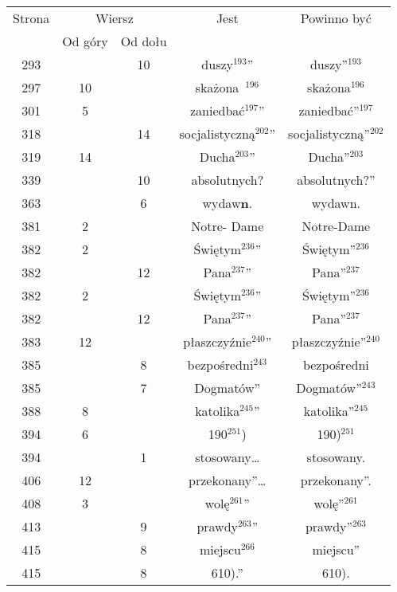 \documentclass[a4paper,11pt]{article}
\numberwithin{equation}{section}
\begin{document}
\begin{center}
  \begin{tabular}{|c|c|c|c|c|}
    \hline
    Strona & \multicolumn{2}{c|}{Wiersz} & Jest
                              & Powinno być \\ \cline{2-3}
    & Od góry & Od dołu & & \\
    \hline
    293 & & 10 & duszy$^{ 193 }$” & duszy”$^{ 193 }$ \\
    297 & 10 & & skażona~$^{ 196 }$ & skażona$^{ 196 }$ \\
    301 & \hphantom{0}5 & & zaniedbać$^{ 197 }$” & zaniedbać”$^{ 197 }$ \\
    318 & & 14 & socjalistyczną$^{ 202 }$” & socjalistyczną”$^{ 202 }$ \\
    319 & 14 & & Ducha$^{ 203 }$” & Ducha”$^{ 203 }$ \\
    339 & & 10 & absolutnych? & absolutnych?” \\
    363 & & \hphantom{0}6 & wydaw\textbf{n}. & wydawn. \\
    381 & \hphantom{0}2 & & Notre- Dame & Notre-Dame \\
    382 & \hphantom{0}2 & & Świętym$^{ 236 }$” & Świętym”$^{ 236 }$ \\
    382 & & 12 & Pana$^{ 237 }$” & Pana”$^{ 237 }$ \\
    382 & \hphantom{0}2 & & Świętym$^{ 236 }$” & Świętym”$^{ 236 }$ \\
    382 & & 12 & Pana$^{ 237 }$” & Pana”$^{ 237 }$ \\
    383 & 12 & & płaszczyźnie$^{ 240 }$” & płaszczyźnie”$^{ 240 }$ \\
    385 & & \hphantom{0}8 & bezpośredni$^{ 243 }$ & bezpośredni \\
    385 & & \hphantom{0}7 & Dogmatów” & Dogmatów”$^{ 243 }$ \\
    388 & \hphantom{0}8 & & katolika$^{ 245 }$” & katolika”$^{ 245 }$ \\
    394 & \hphantom{0}6 & & 190$^{ 251 }$) & 190)$^{ 251 }$ \\
    394 & & \hphantom{0}1 & stosowany\ldots & stosowany. \\
    406 & 12 & & przekonany”\ldots & przekonany”. \\
    408 & \hphantom{0}3 & & wolę$^{ 261 }$” & wolę”$^{ 261 }$ \\
    413 & & \hphantom{0}9 & prawdy$^{ 263 }$” & prawdy”$^{ 263 }$ \\
    415 & & \hphantom{0}8 & miejscu$^{ 266 }$ & miejscu” \\
    415 & & \hphantom{0}8 & 610).” & 610). \\

\end{tabular}
\end{center}
\end{document}
